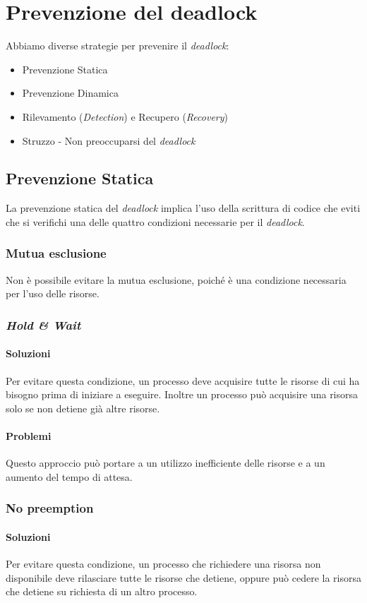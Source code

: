 \section{Prevenzione del deadlock}
    Abbiamo diverse strategie per prevenire il \textit{deadlock}:
    \begin{itemize}
        \item Prevenzione Statica
        \item Prevenzione Dinamica
        \item Rilevamento (\textit{Detection}) e Recupero (\textit{Recovery})
        \item Struzzo - Non preoccuparsi del \textit{deadlock}
    \end{itemize}
    \subsection{Prevenzione Statica}
        La prevenzione statica del \textit{deadlock} implica l'uso della scrittura di codice che eviti che si verifichi una delle quattro condizioni necessarie per il \textit{deadlock}.
        \subsubsection{Mutua esclusione} 
            Non è possibile evitare la mutua esclusione, poiché è una condizione necessaria per l'uso delle risorse.
        \subsubsection{\textit{Hold \& Wait}} 
            \paragraph{Soluzioni}
                Per evitare questa condizione, un processo deve acquisire tutte le risorse di cui ha bisogno prima di iniziare a eseguire. Inoltre un processo può acquisire una risorsa solo se non detiene già altre risorse.
            \paragraph{Problemi} Questo approccio può portare a un utilizzo inefficiente delle risorse e a un aumento del tempo di attesa.
        \subsubsection{No preemption}
            \paragraph{Soluzioni} 
                Per evitare questa condizione, un processo che richiedere una risorsa non disponibile deve rilasciare tutte le risorse che detiene, oppure può cedere la risorsa che detiene su richiesta di un altro processo.
